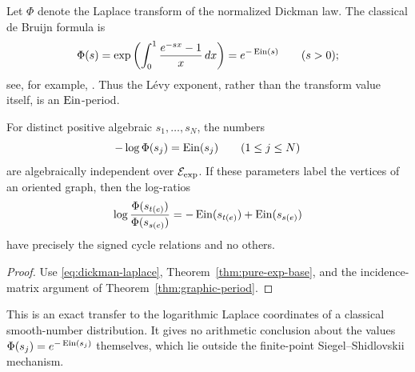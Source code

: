 Let \(\Phi\) denote the Laplace transform of the normalized Dickman law.
The classical de Bruijn formula is
\begin{equation}\label{eq:dickman-laplace}
 \Phi(s)=\exp\left(\int_0^1\frac{e^{-sx}-1}{x}\,dx\right)
        =e^{-\operatorname{Ein}(s)}\qquad(s>0);
\end{equation}
see, for example, \cite{Moree2014}.  Thus the L\'evy exponent, rather than
the transform value itself, is an \(\operatorname{Ein}\)-period.

\begin{corollary}
\label{cor:dickman-matroid}
For distinct positive algebraic \(s_1,\ldots,s_N\), the numbers
\[
 -\log\Phi(s_j)=\operatorname{Ein}(s_j)\qquad(1\le j\le N)
\]
are algebraically independent over \(\mathcal E_{\mathrm{exp}}\).  If these parameters label
the vertices of an oriented graph, then the log-ratios
\[
 \log\frac{\Phi(s_{t(e)})}{\Phi(s_{s(e)})}
 =-\operatorname{Ein}(s_{t(e)})+\operatorname{Ein}(s_{s(e)})
\]
have precisely the signed cycle relations and no others.
\end{corollary}

\begin{proof}
Use \eqref{eq:dickman-laplace}, Theorem~\ref{thm:pure-exp-base}, and the
incidence-matrix argument of Theorem~\ref{thm:graphic-period}.
\end{proof}

This is an exact transfer to the logarithmic Laplace coordinates of a
classical smooth-number distribution.  It gives no arithmetic conclusion
about the values \(\Phi(s_j)=e^{-\operatorname{Ein}(s_j)}\) themselves, which lie outside
the finite-point Siegel--Shidlovskii mechanism.
